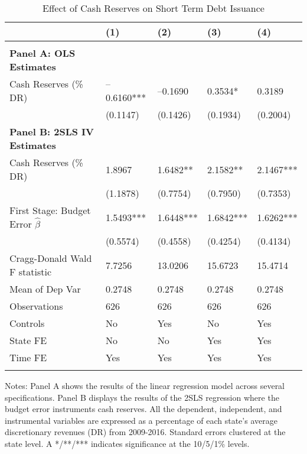 \documentclass{article}
\begin{document}
\begin{table}[tbp] \centering
{}

\caption{Effect of Cash Reserves on Short Term Debt Issuance}
\label{tab:Regression_StDebt}
\begin{tabularx}{\linewidth}{lCCCC}

\toprule
&{(1)}&{(2)}&{(3)}&{(4)} \tabularnewline \midrule
{}&{}&{}&{}&{} \tabularnewline
\midrule \addlinespace[\belowrulesep]
\textbf{Panel A: OLS Estimates}&&&& \tabularnewline
\midrule Cash Reserves (\% DR)&--0.6160***&--0.1690&0.3534*&0.3189 \tabularnewline
&(0.1147)&(0.1426)&(0.1934)&(0.2004) \tabularnewline
\textbf{Panel B: 2SLS IV Estimates}&&&& \tabularnewline
\midrule Cash Reserves (\% DR)&1.8967&1.6482**&2.1582**&2.1467*** \tabularnewline
&(1.1878)&(0.7754)&(0.7950)&(0.7353) \tabularnewline
First Stage: Budget Error $\hat{\beta}$&1.5493***&1.6448***&1.6842***&1.6262*** \tabularnewline
&(0.5574)&(0.4558)&(0.4254)&(0.4134) \tabularnewline
Cragg-Donald Wald F statistic&7.7256&13.0206&15.6723&15.4714 \tabularnewline
\midrule Mean of Dep Var&0.2748&0.2748&0.2748&0.2748 \tabularnewline
Observations&626&626&626&626 \tabularnewline
Controls&No&Yes&No&Yes \tabularnewline
State FE&No&No&Yes&Yes \tabularnewline
Time FE&Yes&Yes&Yes&Yes \tabularnewline
\bottomrule \addlinespace[\belowrulesep]

\end{tabularx}
\begin{flushleft}
\footnotesize Notes: Panel A shows the results of the linear regression model across several specifications. Panel B displays the results of the 2SLS regression where the budget error instruments cash reserves. All the dependent, independent, and instrumental variables are expressed as a percentage of each state's average discretionary revenues (DR) from 2009-2016. Standard errors clustered at the state level. A */**/*** indicates significance at the 10/5/1\% levels.
\end{flushleft}
\end{table}
\end{document}
